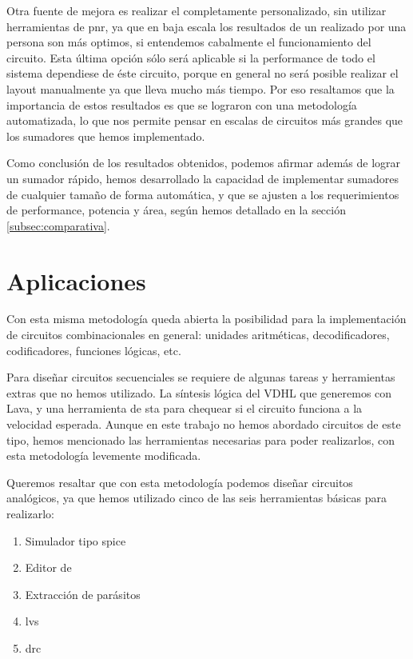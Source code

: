 Otra fuente de mejora es realizar el \layout completamente personalizado, sin utilizar herramientas de \gls{pnr}, ya que en baja escala los resultados de un \layout realizado por una persona son más optimos, si entendemos cabalmente el funcionamiento del circuito. Esta última opción sólo será aplicable si la performance de todo el sistema dependiese de éste circuito, porque en general no será posible realizar el layout manualmente ya que lleva mucho más tiempo. Por eso resaltamos que la importancia de estos resultados es que se lograron con una metodología automatizada, lo que nos permite pensar en escalas de circuitos más grandes que los sumadores que hemos implementado.

Como conclusión de los resultados obtenidos, podemos afirmar además de lograr un sumador rápido, hemos desarrollado la capacidad de implementar sumadores de cualquier tamaño de forma automática, y que se ajusten a los requerimientos de performance, potencia y área,  según hemos detallado en la sección \ref{subsec:comparativa}.


\section{Aplicaciones}

Con esta misma metodología queda abierta la posibilidad para la implementación de circuitos combinacionales en general: unidades aritméticas, decodificadores, codificadores, funciones lógicas, etc. 

Para diseñar circuitos secuenciales se requiere de algunas tareas y herramientas extras que no hemos utilizado. La síntesis lógica del VDHL que generemos con Lava, y una herramienta de \gls{sta} para chequear si el circuito funciona a la velocidad esperada. Aunque en este trabajo no hemos abordado circuitos de este tipo, hemos mencionado las herramientas necesarias para poder realizarlos, con esta metodología levemente modificada.

Queremos resaltar que con esta metodología podemos diseñar circuitos analógicos, ya que hemos utilizado cinco de las seis herramientas básicas para realizarlo:
\begin{enumerate}\itemsep2pt
\item Simulador tipo \gls{spice}
\item Editor de \layout
\item Extracción de parásitos
\item \gls{lvs}
\item \gls{drc}
\end{enumerate}

